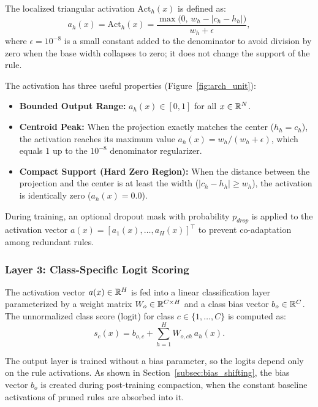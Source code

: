 The localized triangular activation $\text{Act}_h(x)$ is defined as:
\begin{equation}
\label{eq:triangular_activation}
a_h(x) = \text{Act}_h(x) = \frac{\max\Big(0, \, w_h - |c_h - h_h|\Big)}{w_h + \epsilon},
\end{equation}
where $\epsilon = 10^{-8}$ is a small constant added to the denominator to avoid division by zero when the base width collapses to zero; it does not change the support of the rule.

The activation has three useful properties (Figure~\ref{fig:arch_unit}):
\begin{itemize}
    \item \textbf{Bounded Output Range:} $a_h(x) \in [0, 1]$ for all $x \in \mathbb{R}^N$.
    \item \textbf{Centroid Peak:} When the projection exactly matches the center ($h_h = c_h$), the activation reaches its maximum value $a_h(x) = w_h/(w_h+\epsilon)$, which equals $1$ up to the $10^{-8}$ denominator regularizer.
    \item \textbf{Compact Support (Hard Zero Region):} When the distance between the projection and the center is at least the width ($|c_h - h_h| \ge w_h$), the activation is identically zero ($a_h(x) = 0.0$).
\end{itemize}

During training, an optional dropout mask with probability $p_{drop}$ is applied to the activation vector $a(x) = [a_1(x), \dots, a_H(x)]^\top$ to prevent co-adaptation among redundant rules.

\subsubsection{Layer 3: Class-Specific Logit Scoring}
The activation vector $a(x) \in \mathbb{R}^H$ is fed into a linear classification layer parameterized by a weight matrix $W_o \in \mathbb{R}^{C \times H}$ and a class bias vector $b_o \in \mathbb{R}^C$. The unnormalized class score (logit) for class $c \in \{1, \dots, C\}$ is computed as:
\begin{equation}
\label{eq:output_scoring}
s_c(x) = b_{o,c} + \sum_{h=1}^H W_{o,ch} \, a_h(x).
\end{equation}

The output layer is trained without a bias parameter, so the logits depend only on the
rule activations. As shown in Section~\ref{subsec:bias_shifting}, the bias vector $b_o$
is created during post-training compaction, when the constant baseline activations of
pruned rules are absorbed into it.

